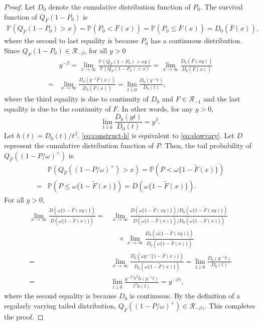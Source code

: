 \documentclass[10pt,a4paper]{amsart}
\renewcommand{\Pr}{\mathbb{P}}
\begin{document}
\begin{proof}
Let $D_0$ denote the cumulative distribution function of $P_0$. The survival function of $Q_F(1-P_0)$ is
\begin{align*}
\Pr(Q_F(1-P_0)>x)= \Pr(P_0<\overline{F}(x))=\Pr(P_0\le\overline{F}(x))=D_0\left(\overline{F}(x)\right), 
\end{align*}
where the second to last equality is because $P_0$ has a continuous distribution.
Since $Q_F(1-P_0)\in\mathscr{R}_{-\beta}$, for all $y>0$
\begin{align*}
&y^{-\beta}
=\lim_{x\to\infty}\frac{\Pr\left(Q_F(1-P_0)>xy\right)}{\Pr\left(Q_F(1-P_0)>x\right)}
=\lim_{x\to\infty}\frac{D_0\left(\overline{F}(xy)\right)}{D_0\left(\overline{F}(x)\right)}\\
=&\lim_{x\to\infty}\frac{D_0\left(y^{-1}\overline{F}(x)\right)}{D_0\left(\overline{F}(x)\right)}
=\lim_{t\downarrow0}\frac{D_0\left(y^{-1}t\right)}{D_0\left(t\right)},  
\end{align*}
where the third equality is due to continuity of $D_0$ and $F\in \mathscr{R}_{-1}$ and the last equality is due to the continuity of $F$. In other words, for any $y>0$,
\begin{equation}
\label{eq:construct-h}
\lim_{t\downarrow0}\frac{D_0\left(yt\right)}{D_0\left(t\right)}=y^{\beta}.
\end{equation}
Let $h(t)=D_0(t)/t^\beta$. \eqref{eq:construct-h} is equivalent to  \eqref{eq:slowvary}.
Let $D$ represent the cumulative distribution function of $P$. Then, the tail probability of $Q_{\tilde F}\left((1-P/\omega)^+\right)$ is
\begin{align*}
&\Pr(Q_{\tilde F}\left((1-P/\omega)^+\right)>x)
= \Pr(P < \omega\{1-\tilde{F}(x)\})\\
=&\Pr(P \le \omega\{1-\tilde{F}(x)\})
=D\left(\omega\{1-\tilde F(x)\}\right).
\end{align*}
For all $y>0$,
\begin{align*}
\lim_{x\to\infty}\frac{D\left(\omega\{1-\tilde F(xy)\}\right)}{D\left(\omega\{1-\tilde F(x)\}\right)}
=&\lim_{x\to\infty}\frac{D\left(\omega\{1-\tilde F(xy)\}\right)/D_0\left(\omega\{1-\tilde F(xy)\}\right)}{D\left(\omega\{1-\tilde F(x)\}\right)/D_0\left(\omega\{1-\tilde F(x)\}\right)}\\
&\quad\times\lim_{x\to\infty}\frac{D_0\left(\omega\{1-\tilde F(xy)\}\right)}{D_0\left(\omega\{1-\tilde F(x)\}\right)}\\
=&\lim_{x\to\infty}\frac{D_0\left(\omega y^{-\gamma}\{1-\tilde F(x)\}\right)}{D_0\left(\omega\{1-\tilde F(x)\}\right)}
=\lim_{t\downarrow0}\frac{D_0\left(y^{-\gamma}t\right)}{D_0\left(t\right)}\\
=&\lim_{t\downarrow0}\frac{y^{-\beta\gamma} t^{\beta} h\left(y^{-\gamma}t\right)}{t^\beta h\left(t\right)}
=y^{-\beta\gamma},
\end{align*}
where the second equality is because $D_0$ is continuous. By the definition of a regularly varying tailed distribution, $Q_{\tilde F}\left((1-P/\omega)^+\right)\in\mathscr{R}_{-\beta\gamma}$. This completes the proof.
\end{proof}
\end{document}
